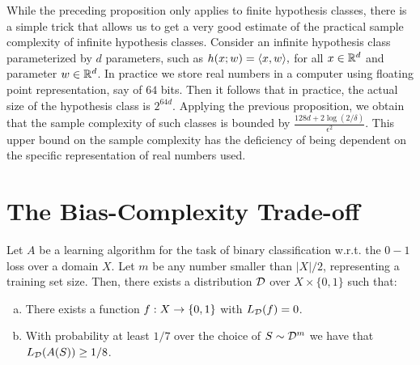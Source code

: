 \documentclass[11pt,a4paper]{article}
\begin{document}
\begin{remark}
While the preceding proposition only applies to finite hypothesis classes, there is a simple trick that allows us to get a very good estimate of the practical sample complexity of infinite hypothesis classes. Consider an infinite hypothesis class parameterized by $d$ parameters, such as $h(x;w) = \langle x, w \rangle,$ for all $x\in\mathbb{R}^d$ and parameter $w\in\mathbb{R}^d$. In practice we store real numbers in a computer using floating point representation, say of $64$ bits. Then it follows that in practice, the actual size of the hypothesis class is $2^{64d}$. Applying the previous proposition, we obtain that the sample complexity of such classes is bounded by $\frac{128d+2\log{(2/\delta)}}{\epsilon^2}$. This upper bound on the sample complexity has the deficiency of being dependent on the specific representation of real numbers used. 
\end{remark}

\section{The Bias-Complexity Trade-off}

\begin{prop}
Let $A$ be a learning algorithm for the task of binary classification w.r.t. the $0-1$ loss over a domain $X$. Let $m$ be any number smaller than $|X|/2$, representing a training set size. Then, there exists a distribution $\mathcal{D}$ over $X\times \{0,1\}$ such that:
\begin{enumerate}[(a)]
    \item There exists a function $f:X\rightarrow \{0,1\}$ with $L_{\mathcal{D}}(f) = 0$.
    \item With probability at least $1/7$ over the choice of $S\sim \mathcal{D}^m$ we have that $L_{\mathcal{D}}(A(S))\ge 1/8$.
\end{enumerate}
\end{prop}
\end{document}
